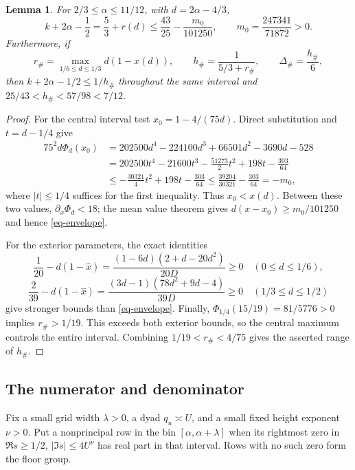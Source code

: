 \documentclass[11pt,a4paper]{article}
\numberwithin{equation}{section}
\newtheorem{lemma}[theorem]{Lemma}
\theoremstyle{remark}
\begin{document}
\begin{lemma}\label{lem-envelope}
For $2/3\le\alpha\le11/12$, with $d=2\alpha-4/3$,
\begin{equation}\label{eq-envelope}
 k+2\alpha-\frac12=\frac53+r(d)
 \le\frac{43}{25}-\frac{m_0}{101250},
 \qquad m_0=\frac{247341}{71872}>0.
\end{equation}
Furthermore, if
\begin{equation}\label{eq-endpoint}
 r_\#=\max_{1/6\le d\le1/3}d(1-x(d)),\qquad
 h_\#=\frac1{5/3+r_\#},\qquad \Delta_\#=\frac{h_\#}{6},
\end{equation}
then $k+2\alpha-1/2\le1/h_\#$ throughout the same interval and
$25/43<h_\#<57/98<7/12$.
\end{lemma}

\begin{proof}
For the central interval test $x_0=1-4/(75d)$.  Direct substitution
and $t=d-1/4$ give
\begin{align*}
 75^2d\Phi_d(x_0)
 &=202500d^4-224100d^3+66501d^2-3690d-528\\
 &=202500t^4-21600t^3-\frac{51273}{2}t^2
                              +198t-\frac{303}{64}\\
 &\le-\frac{30321}{4}t^2+198t-\frac{303}{64}
 \le\frac{39204}{30321}-\frac{303}{64}=-m_0,
\end{align*}
where $|t|\le1/4$ suffices for the first inequality.  Thus
$x_0<x(d)$.  Between these two values, $\partial_x\Phi_d<18$;
the mean value theorem gives
$d(x-x_0)\ge m_0/101250$ and hence \eqref{eq-envelope}.

For the exterior parameters, the exact identities
\[
 \frac1{20}-d(1-\widehat x)
 =\frac{(1-6d)(2+d-20d^2)}{20D}\ge0\quad(0\le d\le1/6),
\]
\[
 \frac2{39}-d(1-\widehat x)
 =\frac{(3d-1)(78d^2+9d-4)}{39D}\ge0\quad(1/3\le d\le1/2)
\]
give stronger bounds than \eqref{eq-envelope}.  Finally,
$\Phi_{1/4}(15/19)=81/5776>0$ implies $r_\#>1/19$.
This exceeds both exterior bounds, so the central maximum controls
the entire interval.  Combining $1/19<r_\#<4/75$ gives the
asserted range of $h_\#$.
\end{proof}

\subsection{The numerator and denominator}

Fix a small grid width $\lambda>0$, a dyad $q_u\asymp U$, and
a small fixed height exponent $\nu>0$.  Put a nonprincipal row
in the bin $[\alpha,\alpha+\lambda]$ when its rightmost zero in
$\Re s\ge1/2$, $|\Im s|\le4U^\nu$ has real part in that interval.
Rows with no such zero form the floor group.
\end{document}

